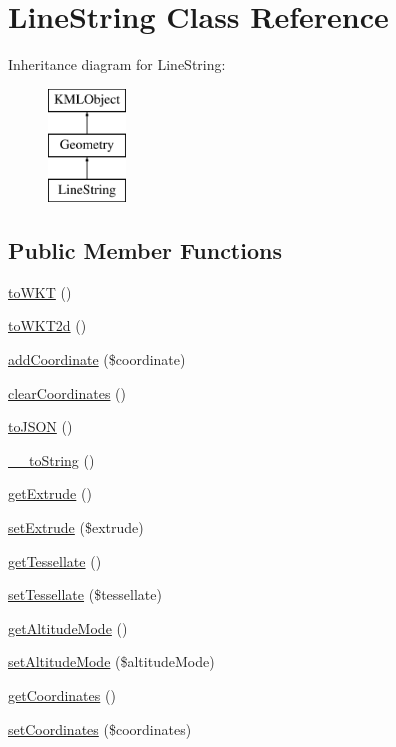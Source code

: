 \hypertarget{classLineString}{
\section{LineString Class Reference}
\label{db/da8/classLineString}
}
Inheritance diagram for LineString:\begin{figure}[H]
\begin{center}
\leavevmode
\includegraphics[height=3.000000cm]{db/da8/classLineString}
\end{center}
\end{figure}
\subsection*{Public Member Functions}
\begin{DoxyCompactItemize}
\item 
\hyperlink{classLineString_a70abd0023e4bce1635e84459c6c9afcb}{toWKT} ()
\item 
\hyperlink{classLineString_a57877fe155da546e8de702d9a99e12e3}{toWKT2d} ()
\item 
\hyperlink{classLineString_a7275309ff436bd10532b696f4948e3e7}{addCoordinate} (\$coordinate)
\item 
\hyperlink{classLineString_a0429f3224d5228cdf2a82a62d8f012ec}{clearCoordinates} ()
\item 
\hyperlink{classLineString_a681df65da7dbcfd84a14e4271a556d18}{toJSON} ()
\item 
\hyperlink{classLineString_a5b2c81cd1daa82cecf28596e15587803}{\_\-\_\-toString} ()
\item 
\hyperlink{classLineString_ada1ea7495c6bbf9dfee6ec11c91f6e46}{getExtrude} ()
\item 
\hyperlink{classLineString_a3b66b11296cbb1cfdb4df132b8f4a012}{setExtrude} (\$extrude)
\item 
\hyperlink{classLineString_a1bbbbae610ec4a957307c7a5f7fcfc76}{getTessellate} ()
\item 
\hyperlink{classLineString_ab5a1cebca0aea5322222c46b966a68ef}{setTessellate} (\$tessellate)
\item 
\hyperlink{classLineString_aeaca6d9c706a9416f7deaa7487309050}{getAltitudeMode} ()
\item 
\hyperlink{classLineString_a405795d5750aac9903bff4c02739e124}{setAltitudeMode} (\$altitudeMode)
\item 
\hyperlink{classLineString_aa036d60f92d61c8ea47aef02607e9d6a}{getCoordinates} ()
\item 
\hyperlink{classLineString_ab19dd8234a7729572a47f7602e5fb3c2}{setCoordinates} (\$coordinates)
\end{DoxyCompactItemize}


